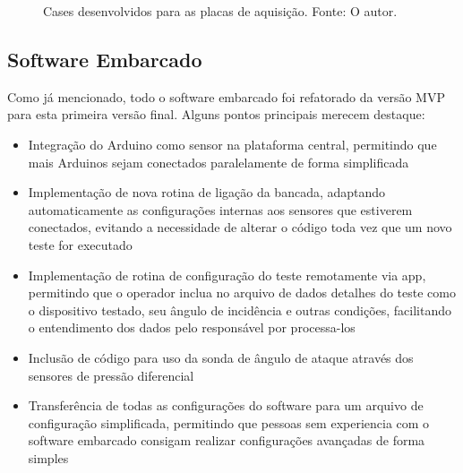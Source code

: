 \begin{figure}[!ht]
    \centering
    \caption{Cases desenvolvidos para as placas de aquisição. Fonte: O autor.}
        \label{case_pitot}
        \qquad
        \label{case_celulas}
\end{figure}

\subsection{Software Embarcado}

Como já mencionado, todo o software embarcado foi refatorado da versão MVP para esta primeira versão final. Alguns pontos principais merecem destaque:

\begin{itemize}
    \item Integração do Arduino como sensor na plataforma central, permitindo que mais Arduinos sejam conectados paralelamente de forma simplificada
    \item Implementação de nova rotina de ligação da bancada, adaptando automaticamente as configurações internas aos sensores que estiverem conectados, evitando a necessidade de alterar o código toda vez que um novo teste for executado
    \item Implementação de rotina de configuração do teste remotamente via app, permitindo que o operador inclua no arquivo de dados detalhes do teste como o dispositivo testado, seu ângulo de incidência e outras condições, facilitando o entendimento dos dados pelo responsável por processa-los 
    \item Inclusão de código para uso da sonda de ângulo de ataque através dos sensores de pressão diferencial
    \item Transferência de todas as configurações do software para um arquivo de configuração simplificada, permitindo que pessoas sem experiencia com o software embarcado consigam realizar configurações avançadas de forma simples
\end{itemize}

